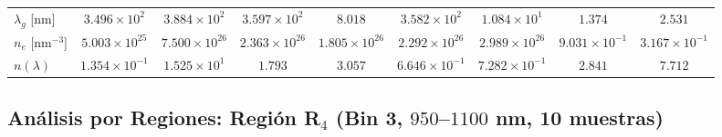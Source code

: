 \documentclass{article}
\begin{document}
\begin{table}[htbp]
\begin{tabular}{@{}lcccccccc@{}}
$\lambda_{g}$ [nm] & $3.496 \times 10^2$ & $3.884 \times 10^2$ & $3.597 \times 10^2$ & $8.018$ & $3.582 \times 10^2$ & $1.084 \times 10^1$ & $1.374$ & $2.531$ \\
$n_{e}$ [nm$^{-3}$] & $5.003 \times 10^{25}$ & $7.500 \times 10^{26}$ & $2.363 \times 10^{26}$ & $1.805 \times 10^{26}$ & $2.292 \times 10^{26}$ & $2.989 \times 10^{26}$ & $9.031 \times 10^{-1}$ & $3.167 \times 10^{-1}$ \\
$n(\lambda)$ & $1.354 \times 10^{-1}$ & $1.525 \times 10^1$ & $1.793$ & $3.057$ & $6.646 \times 10^{-1}$ & $7.282 \times 10^{-1}$ & $2.841$ & $7.712$ \\
\bottomrule
\end{tabular}
\end{table}

\subsection{An\'alisis por Regiones: Regi\'on R$_4$ (Bin 3, $950$--$1100$ nm, 10 muestras)}
\end{document}
